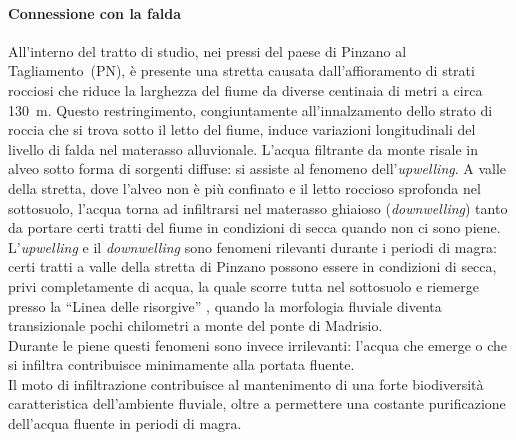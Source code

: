 \paragraph{Connessione con la falda}
All'interno del tratto di studio, nei pressi del paese di Pinzano al Tagliamento~(PN), è presente una stretta causata dall'affioramento di strati rocciosi che riduce la larghezza del fiume da diverse centinaia di metri a circa \SI{130}{\m}.
Questo restringimento, congiuntamente all'innalzamento dello strato di roccia che si trova sotto il letto del fiume, induce variazioni longitudinali del livello di falda nel materasso alluvionale.
L'acqua filtrante da monte risale in alveo sotto forma di sorgenti diffuse: si assiste al fenomeno dell'\emph{upwelling}.
A valle della stretta, dove l'alveo non è più confinato e il letto roccioso sprofonda nel sottosuolo, l'acqua torna ad infiltrarsi nel materasso ghiaioso (\emph{downwelling}) tanto da portare certi tratti del fiume in condizioni di secca quando non ci sono piene.
\\
L'\emph{upwelling} e il \emph{downwelling} sono fenomeni rilevanti durante i periodi di magra: certi tratti a valle della stretta di Pinzano possono essere in condizioni di secca, privi completamente di acqua, la quale scorre tutta nel sottosuolo e riemerge presso la “Linea delle risorgive” , quando la morfologia fluviale diventa transizionale pochi chilometri a monte del ponte di Madrisio.
\\
Durante le piene questi fenomeni sono invece irrilevanti: l'acqua che emerge o che si infiltra contribuisce minimamente alla portata fluente.
\\
Il moto di infiltrazione contribuisce al mantenimento di una forte biodiversità caratteristica dell'ambiente fluviale, oltre a permettere una costante purificazione dell'acqua fluente in periodi di magra.

